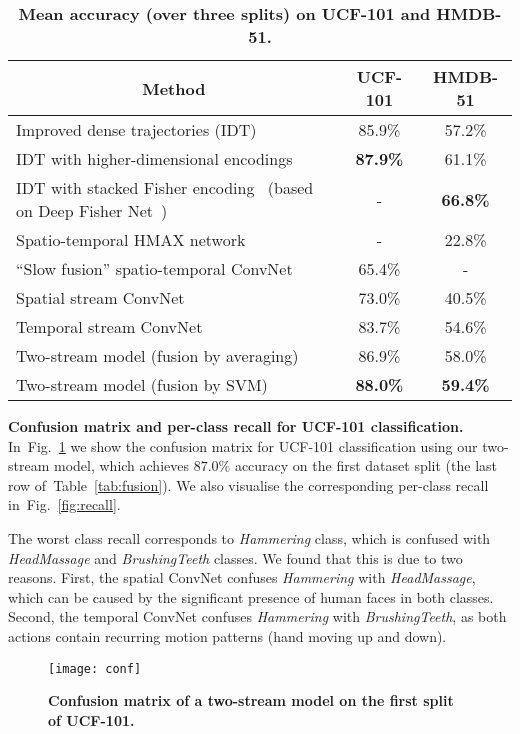 \documentclass{article} \usepackage{nips14submit_e,times}
\newcommand{\figref}[1]{Fig.~\ref{#1}}
\newcommand{\tblref}[1]{Table~\ref{#1}}
\begin{document}
\begin{table}[ht]
\small
\centering
\caption{\textbf{Mean accuracy (over three splits) on UCF-101 and HMDB-51.}
}
\begin{tabular}{|l|c|c|} \hline
\multicolumn{1}{|c|}{Method} & UCF-101 & HMDB-51 \\ \hline
Improved dense trajectories (IDT)~\cite{Wang13b,Wang13c} & 85.9\% & 57.2\% \\ \hline
IDT with higher-dimensional encodings~\cite{Peng14} & \textbf{87.9\%} & 61.1\% \\ \hline
IDT with stacked Fisher encoding~\cite{Peng14a} (based on Deep Fisher Net~\cite{Simonyan13b}) & - & \textbf{66.8\%} \\ \hline
Spatio-temporal HMAX network~\cite{Kuehne11,Jhuang07} & - & 22.8\% \\ \hline
``Slow fusion'' spatio-temporal ConvNet~\cite{Karpathy14} & 65.4\% & - \\ \hline\hline
Spatial stream ConvNet & 73.0\% & 40.5\% \\ \hline
Temporal stream ConvNet & 83.7\% & 54.6\% \\ \hline
Two-stream model (fusion by averaging) & 86.9\% & 58.0\% \\ \hline
Two-stream model (fusion by SVM) & \textbf{88.0\%} & \textbf{59.4\%} \\ \hline
\end{tabular}
\label{tab:comp_SOA}
\end{table}


\noindent\textbf{Confusion matrix and per-class recall for UCF-101 classification.}
In~\figref{fig:conf} we show the confusion matrix for UCF-101 classification using our two-stream model, which achieves $87.0\%$ accuracy on the first dataset split (the last row of~\tblref{tab:fusion}).
We also visualise the corresponding per-class recall in~\figref{fig:recall}.

The worst class recall corresponds to \emph{Hammering} class, which is confused with \emph{HeadMassage} and \emph{BrushingTeeth} classes.
We found that this is due to two reasons. First, the spatial ConvNet confuses \emph{Hammering} with \emph{HeadMassage}, which can be caused by
the significant presence of human faces in both classes. Second, the temporal ConvNet confuses \emph{Hammering} with \emph{BrushingTeeth}, as
both actions contain recurring motion patterns (hand moving up and down).

\begin{figure}[htb]
\centering
\texttt{[image: conf]}
\caption{\textbf{Confusion matrix of a two-stream model on the first split of UCF-101.} 
}
\label{fig:conf}
\end{figure}
\end{document}
